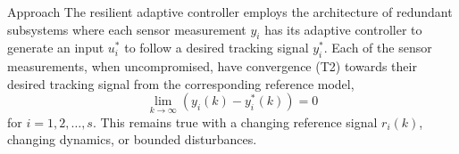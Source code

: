 \begin{section}{Approach}
The resilient adaptive controller employs the architecture of redundant subsystems where each sensor measurement $y_i$ has its adaptive controller to generate an input $u^*_i$ to follow a desired tracking signal $y^*_i$. Each of the sensor measurements, when uncompromised, have convergence (T2) towards their desired tracking signal from the corresponding reference model,
    \begin{equation}
    \label{multiple_output_tracking}
    \lim_{k\to\infty}(y_i(k)-y^*_i(k))=0
    \end{equation}
for $i=1,2,\dots,s$. This remains true with a changing reference signal $r_i(k)$, changing dynamics, or bounded disturbances. 



\end{section}
